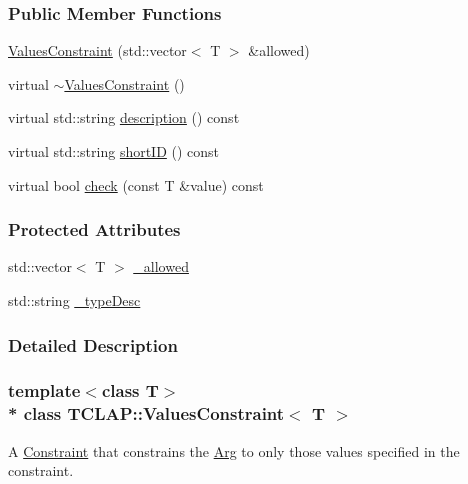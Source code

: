 \subsubsection*{Public Member Functions}
\begin{DoxyCompactItemize}
\item 
\hyperlink{classTCLAP_1_1ValuesConstraint_a8ab127461012bb1dcfac159e17105db9}{Values\+Constraint} (std\+::vector$<$ T $>$ \&allowed)
\item 
virtual \hyperlink{classTCLAP_1_1ValuesConstraint_a9b0c218300a9e0937386f2e566ba21bd}{$\sim$\+Values\+Constraint} ()
\item 
virtual std\+::string \hyperlink{classTCLAP_1_1ValuesConstraint_a07b08c05a7bfcbe5815895353ffef1d5}{description} () const 
\item 
virtual std\+::string \hyperlink{classTCLAP_1_1ValuesConstraint_a1bbe12afcb1f185ee7ac808d69e2d345}{short\+ID} () const 
\item 
virtual bool \hyperlink{classTCLAP_1_1ValuesConstraint_ae132b185413cf5dea5cc040f60e7ede6}{check} (const T \&value) const 
\end{DoxyCompactItemize}
\subsubsection*{Protected Attributes}
\begin{DoxyCompactItemize}
\item 
std\+::vector$<$ T $>$ \hyperlink{classTCLAP_1_1ValuesConstraint_ac43fa83688358c0ad06157053cce347a}{\+\_\+allowed}
\item 
std\+::string \hyperlink{classTCLAP_1_1ValuesConstraint_a6ebc63fa5eea116a50aa5f76aee56fd6}{\+\_\+type\+Desc}
\end{DoxyCompactItemize}


\subsubsection{Detailed Description}
\subsubsection*{template$<$class T$>$\\*
class T\+C\+L\+A\+P\+::\+Values\+Constraint$<$ T $>$}

A \hyperlink{classTCLAP_1_1Constraint}{Constraint} that constrains the \hyperlink{classTCLAP_1_1Arg}{Arg} to only those values specified in the constraint. 

